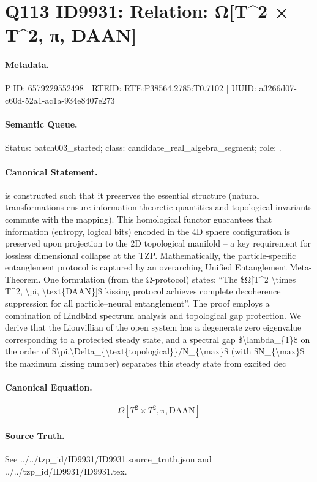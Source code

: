\section*{Q113 ID9931: Relation: Ω[T\textasciicircum{}2 × T\textasciicircum{}2, π, DAAN]}
\paragraph{Metadata.}
PiID: 6579229552498 | RTEID: RTE:P38564.2785:T0.7102 | UUID: a3266d07-c60d-52a1-ac1a-934e8407e273

\paragraph{Semantic Queue.}
Status: batch003\_started; class: candidate\_real\_algebra\_segment; role: .

\paragraph{Canonical Statement.}
is constructed such that it preserves the essential structure (natural transformations ensure information-theoretic quantities and topological invariants commute with the mapping). This homological functor guarantees that information (entropy, logical bits) encoded in the 4D sphere configuration is preserved upon projection to the 2D topological manifold – a key requirement for lossless dimensional collapse at the TZP. Mathematically, the particle-specific entanglement protocol is captured by an overarching Unified Entanglement Meta-Theorem. One formulation (from the Ω-protocol) states: “The \$Ω[T\textasciicircum{}2 \textbackslash{}times T\textasciicircum{}2, \textbackslash{}pi, \textbackslash{}text\{DAAN\}]\$ kissing protocol achieves complete decoherence suppression for all particle–neural entanglement”. The proof employs a combination of Lindblad spectrum analysis and topological gap protection. We derive that the Liouvillian of the open system has a degenerate zero eigenvalue corresponding to a protected steady state, and a spectral gap \$\textbackslash{}lambda\_\{1\}\$ on the order of \$\textbackslash{}pi,\textbackslash{}Delta\_\{\textbackslash{}text\{topological\}\}/N\_\{\textbackslash{}max\}\$ (with \$N\_\{\textbackslash{}max\}\$ the maximum kissing number) separates this steady state from excited dec

\paragraph{Canonical Equation.}
\[
Ω[T^2 \times T^2, \pi, \text{DAAN}]
\]

\paragraph{Source Truth.}
See ../../tzp\_id/ID9931/ID9931.source\_truth.json and ../../tzp\_id/ID9931/ID9931.tex.
